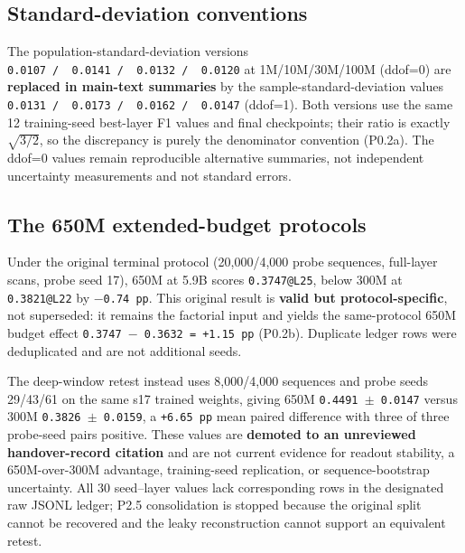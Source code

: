 \hypertarget{a.3-standard-deviation-conventions}{%
\subsection{Standard-deviation conventions}\label{a.3-standard-deviation-conventions}}

The population-standard-deviation versions \texttt{0.0107\ /\allowbreak\ \ 0.0141\ /\allowbreak\ \ 0.0132\ /\allowbreak\ \ 0.0120} at 1M/10M/30M/100M (ddof=0) are \textbf{replaced in main-text summaries} by the sample-standard-deviation values \texttt{0.0131\ /\allowbreak\ \ 0.0173\ /\allowbreak\ \ 0.0162\ /\allowbreak\ \ 0.0147} (ddof=1). Both versions use the same 12 training-seed best-layer F1 values and final checkpoints; their ratio is exactly \(\sqrt{3/2}\), so the discrepancy is purely the denominator convention (P0.2a). The ddof=0 values remain reproducible alternative summaries, not independent uncertainty measurements and not standard errors.

\hypertarget{a.4-the-650m-extended-budget-protocols}{%
\subsection{The 650M extended-budget protocols}\label{a.4-the-650m-extended-budget-protocols}}

Under the original terminal protocol (20,000/4,000 probe sequences, full-layer scans, probe seed 17), 650M at 5.9B scores \texttt{0.3747@L25}, below 300M at \texttt{0.3821@L22} by \texttt{\(-\)0.74\ pp}. This original result is \textbf{valid but protocol-specific}, not superseded: it remains the factorial input and yields the same-protocol 650M budget effect \texttt{0.3747\ \(-\)\ 0.3632\ =\ +1.15\ pp} (P0.2b). Duplicate ledger rows were deduplicated and are not additional seeds.

The deep-window retest instead uses 8,000/4,000 sequences and probe seeds 29/43/61 on the same s17 trained weights, giving 650M \texttt{0.4491\ \(\pm\)\ 0.0147} versus 300M \texttt{0.3826\ \(\pm\)\ 0.0159}, a \texttt{+6.65\ pp} mean paired difference with three of three probe-seed pairs positive. These values are \textbf{demoted to an unreviewed handover-record citation} and are not current evidence for readout stability, a 650M-over-300M advantage, training-seed replication, or sequence-bootstrap uncertainty. All 30 seed--layer values lack corresponding rows in the designated raw JSONL ledger; P2.5 consolidation is stopped because the original split cannot be recovered and the leaky reconstruction cannot support an equivalent retest.

